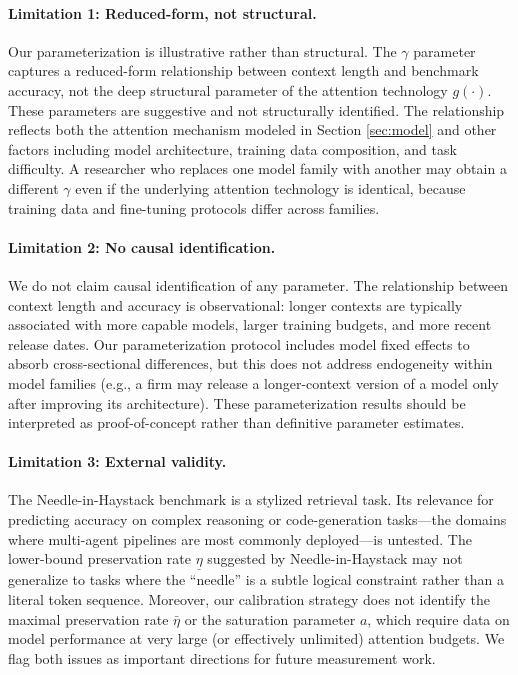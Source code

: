 \paragraph{Limitation 1: Reduced-form, not structural.} Our parameterization is illustrative rather than structural. The $\gamma$ parameter captures a reduced-form relationship between context length and benchmark accuracy, not the deep structural parameter of the attention technology $g(\cdot)$. These parameters are suggestive and not structurally identified. The relationship reflects both the attention mechanism modeled in Section \ref{sec:model} and other factors including model architecture, training data composition, and task difficulty. A researcher who replaces one model family with another may obtain a different $\gamma$ even if the underlying attention technology is identical, because training data and fine-tuning protocols differ across families.

\paragraph{Limitation 2: No causal identification.} We do not claim causal identification of any parameter. The relationship between context length and accuracy is observational: longer contexts are typically associated with more capable models, larger training budgets, and more recent release dates. Our parameterization protocol includes model fixed effects to absorb cross-sectional differences, but this does not address endogeneity within model families (e.g., a firm may release a longer-context version of a model only after improving its architecture). These parameterization results should be interpreted as proof-of-concept rather than definitive parameter estimates.

\paragraph{Limitation 3: External validity.} The Needle-in-Haystack benchmark is a stylized retrieval task. Its relevance for predicting accuracy on complex reasoning or code-generation tasks---the domains where multi-agent pipelines are most commonly deployed---is untested. The lower-bound preservation rate $\underline{\eta}$ suggested by Needle-in-Haystack may not generalize to tasks where the ``needle'' is a subtle logical constraint rather than a literal token sequence. Moreover, our calibration strategy does not identify the maximal preservation rate $\bar{\eta}$ or the saturation parameter $a$, which require data on model performance at very large (or effectively unlimited) attention budgets. We flag both issues as important directions for future measurement work.

